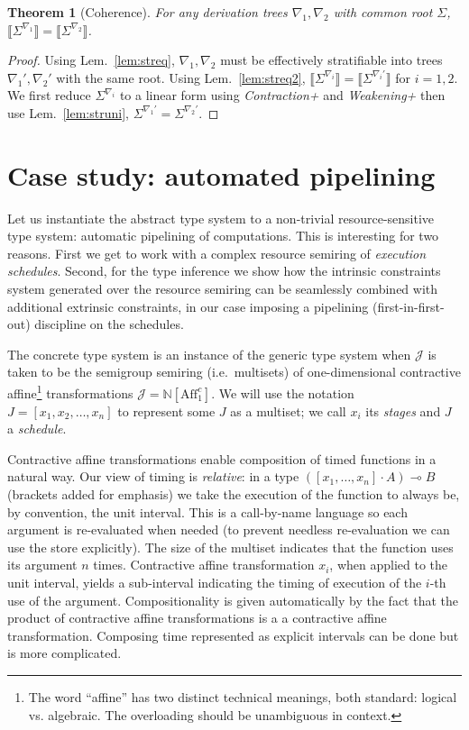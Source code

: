 \documentclass{article}
\newcommand{\aff}{\mathrm{Aff}_1^c}
\newcommand{\sbr}[1]{\llbracket {#1}\rrbracket}
\newtheorem{theorem}{Theorem}
\begin{document}
\begin{theorem}[Coherence]
For any   derivation trees ${\nabla_1},{\nabla_2}$ with common root $\Sigma$,  $\sbr{\Sigma^{\nabla_1}}=\sbr{\Sigma^{\nabla_2}}$.
\end{theorem}
\begin{proof}
  Using Lem.~\ref{lem:streq}, $\nabla_1,\nabla_2$ must be effectively stratifiable into
   trees $\nabla_1',\nabla_2'$ with the same root. Using Lem.~\ref{lem:streq2},
  $\sbr{\Sigma^{\nabla_i}}=\sbr{\Sigma^{\nabla_i'}}$ for
  $i=1,2$. We first reduce $\Sigma^{\nabla_i}$ to a linear form using \emph{Contraction+} and \emph{Weakening+} then use Lem.~\ref{lem:struni},
  ${\Sigma^{\nabla_1'}}={\Sigma^{\nabla_2'}}$. 
\end{proof}


\section{Case study: automated pipelining}\label{chap:pipes}
Let us instantiate the abstract type system to a non-trivial resource-sensitive type system: automatic pipelining of computations.  This is interesting for two reasons. First we get to work with a complex resource semiring of \emph{execution schedules}. Second, for the type inference we show how the intrinsic constraints system generated over the resource semiring can be seamlessly combined with additional extrinsic constraints, in our case imposing a pipelining (first-in-first-out) discipline on the schedules. 

The concrete type system is an instance of the generic type system when $\mathcal J$ is taken to be the semigroup semiring (i.e.\ multisets) of one-dimensional contractive affine\footnote{The word ``affine'' has two distinct technical meanings, both standard: logical vs. algebraic. The overloading should be unambiguous in context.} transformations
$
\mathcal J = \mathbb N[\aff].
$
We will use the notation $J=[x_1,x_2,\ldots,x_n]$ to represent some $J$ as a multiset; we call $x_i$ its \emph{stages} and $J$ a \emph{schedule}.

Contractive affine transformations enable composition of timed functions in a natural way. Our view of timing is \emph{relative}: in a type $([x_1,\ldots,x_n]\cdot A)\multimap B$ (brackets added for emphasis) we take the execution of the function to always be, by convention, the unit interval. This is a call-by-name language so each argument is re-evaluated when needed (to prevent needless re-evaluation we can use the store explicitly). The size of the multiset indicates that the function uses its argument $n$ times. Contractive affine transformation $x_i$, when applied to the unit interval, yields a sub-interval indicating the timing of execution of the $i$-th use of the argument. Compositionality is given automatically by the fact that the product of contractive affine transformations is a a contractive affine transformation. Composing time represented as explicit intervals can be done but is more complicated. 
\end{document}
